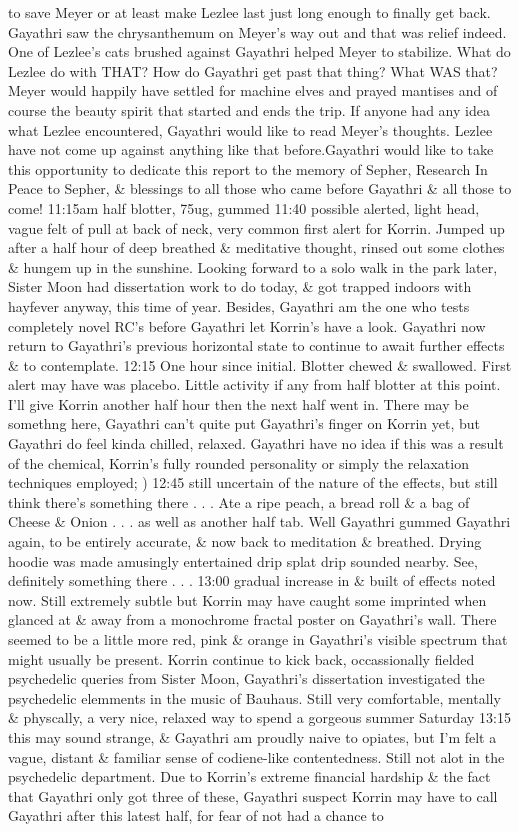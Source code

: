 \documentclass[12pt]{book}
\begin{document}
to save Meyer or at least make Lezlee last just long enough to finally get back. Gayathri saw the chrysanthemum on Meyer's way out and that was relief indeed. One of Lezlee's cats brushed against Gayathri helped Meyer to stabilize. What do Lezlee do with THAT? How do Gayathri get past that thing? What WAS that? Meyer would happily have settled for machine elves and prayed mantises and of course the beauty spirit that started and ends the trip. If anyone had any idea what Lezlee encountered, Gayathri would like to read Meyer's thoughts. Lezlee have not come up against anything like that before.Gayathri would like to take this opportunity to dedicate this report to the memory of Sepher, Research In Peace to Sepher, \& blessings to all those who came before Gayathri \& all those to come! 11:15am half blotter, 75ug, gummed 11:40 possible alerted, light head, vague felt of pull at back of neck, very common first alert for Korrin. Jumped up after a half hour of deep breathed \& meditative thought, rinsed out some clothes \& hungem up in the sunshine. Looking forward to a solo walk in the park later, Sister Moon had dissertation work to do today, \& got trapped indoors with hayfever anyway, this time of year. Besides, Gayathri am the one who tests completely novel RC's before Gayathri let Korrin's have a look. Gayathri now return to Gayathri's previous horizontal state to continue to await further effects \& to contemplate. 12:15 One hour since initial. Blotter chewed \& swallowed. First alert may have was placebo. Little activity if any from half blotter at this point. I'll give Korrin another half hour then the next half went in. There may be somethng here, Gayathri can't quite put Gayathri's finger on Korrin yet, but Gayathri do feel kinda chilled, relaxed. Gayathri have no idea if this was a result of the chemical, Korrin's fully rounded personality or simply the relaxation techniques employed; ) 12:45 still uncertain of the nature of the effects, but still think there's something there . . .  Ate a ripe peach, a bread roll \& a bag of Cheese \& Onion . . .  as well as another half tab. Well Gayathri gummed Gayathri again, to be entirely accurate, \& now back to meditation \& breathed. Drying hoodie was made amusingly entertained drip splat drip sounded nearby. See, definitely something there . . .  13:00 gradual increase in \& built of effects noted now. Still extremely subtle but Korrin may have caught some imprinted when glanced at \& away from a monochrome fractal poster on Gayathri's wall. There seemed to be a little more red, pink \& orange in Gayathri's visible spectrum that might usually be present. Korrin continue to kick back, occassionally fielded psychedelic queries from Sister Moon, Gayathri's dissertation investigated the psychedelic elemments in the music of Bauhaus. Still very comfortable, mentally \& physcally, a very nice, relaxed way to spend a gorgeous summer Saturday 13:15 this may sound strange, \& Gayathri am proudly naive to opiates, but I'm felt a vague, distant \& familiar sense of codiene-like contentedness. Still not alot in the psychedelic department. Due to Korrin's extreme financial hardship \& the fact that Gayathri only got three of these, Gayathri suspect Korrin may have to call Gayathri after this latest half, for fear of not had a chance to 
\end{document}
